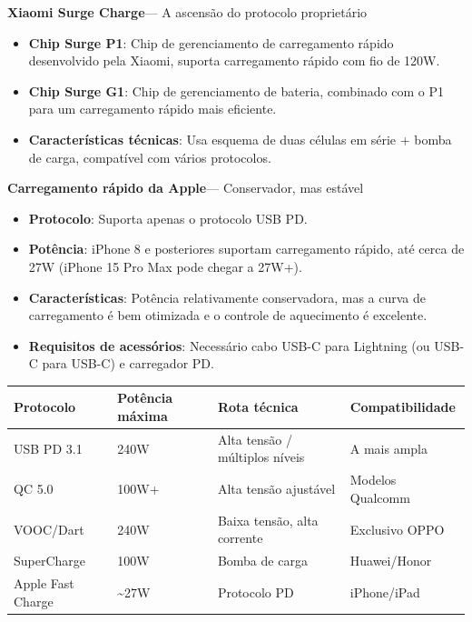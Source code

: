 \textbf{Xiaomi Surge Charge}— A ascensão do protocolo proprietário

\begin{itemize}
  \item \textbf{Chip Surge P1}: Chip de gerenciamento de carregamento rápido desenvolvido pela Xiaomi, suporta carregamento rápido com fio de 120W.
  \item \textbf{Chip Surge G1}: Chip de gerenciamento de bateria, combinado com o P1 para um carregamento rápido mais eficiente.
  \item \textbf{Características técnicas}: Usa esquema de duas células em série + bomba de carga, compatível com vários protocolos.
\end{itemize}

\textbf{Carregamento rápido da Apple}— Conservador, mas estável

\begin{itemize}
  \item \textbf{Protocolo}: Suporta apenas o protocolo USB PD.
  \item \textbf{Potência}: iPhone 8 e posteriores suportam carregamento rápido, até cerca de 27W (iPhone 15 Pro Max pode chegar a 27W+).
  \item \textbf{Características}: Potência relativamente conservadora, mas a curva de carregamento é bem otimizada e o controle de aquecimento é excelente.
  \item \textbf{Requisitos de acessórios}: Necessário cabo USB-C para Lightning (ou USB-C para USB-C) e carregador PD.
\end{itemize}


\begin{center}
\begin{tabularx}{\linewidth}{|X|X|X|X|}
\hline
\textbf{Protocolo} & \textbf{Potência máxima} & \textbf{Rota técnica} & \textbf{Compatibilidade} \tabularnewline
\hline
USB PD 3.1 & 240W & Alta tensão / múltiplos níveis & A mais ampla \tabularnewline
QC 5.0 & 100W+ & Alta tensão ajustável & Modelos Qualcomm \tabularnewline
VOOC/Dart & 240W & Baixa tensão, alta corrente & Exclusivo OPPO \tabularnewline
SuperCharge & 100W & Bomba de carga & Huawei/Honor \tabularnewline
Apple Fast Charge & \textasciitilde{}27W & Protocolo PD & iPhone/iPad \tabularnewline
\hline
\end{tabularx}
\end{center}

